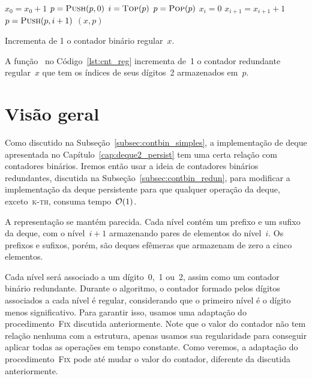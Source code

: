 \documentclass[main.tex]{subfiles}
\begin{document}
\begin{algorithm}
\begin{algorithmic}[1]

    \State $x_0 = x_0 + 1$
        \State $p = \Call{Push}{p, 0}$
    \EndIf
     
        \State $i = \Call{Top}{p}$
        \State $p = \Call{Pop}{p}$
        \State $x_i = 0$
        \State $x_{i+1} = x_{i+1} + 1$
            \State $p = \Call{Push}{p, i + 1}$
        \EndIf
    \EndIf
    \State \Return $(x, p)$
\EndFunction

\end{algorithmic}
\caption{Incrementa de 1 o contador binário regular~$x$. \label{lst:cnt_reg}}
\end{algorithm}

A função~ no Código~\ref{lst:cnt_reg} incrementa de~1 o contador redundante regular~$x$ que tem os índices de seus dígitos~2 armazenados em~$p$.

\section{Visão geral}

Como discutido na Subseção~\ref{subsec:contbin_simples}, a implementação de deque apresentada no Capítulo~\ref{cap:deque2_persist} tem uma certa relação com contadores binários. Iremos então usar a ideia de contadores binários redundantes, discutida na Subseção~\ref{subsec:contbin_redun}, para modificar a implementação da deque persistente para que qualquer operação da deque, exceto~\textsc{k-th}, consuma tempo~$\mathcal{O}(1)$.

A representação se mantém parecida. Cada nível contém um prefixo e um sufixo da deque, com o nível~$i+1$ armazenando pares de elementos do nível~$i$. Os prefixos e sufixos, porém, são deques efêmeras que armazenam de zero a cinco elementos.


Cada nível será associado a um dígito~0,~1 ou~2, assim como um contador binário redundante. Durante o algoritmo, o contador formado pelos dígitos associados a cada nível é regular, considerando que o primeiro nível é o dígito menos significativo. Para garantir isso, usamos uma adaptação do procedimento~\textsc{Fix} discutida anteriormente. Note que o valor do contador não tem relação nenhuma com a estrutura, apenas usamos sua regularidade para conseguir aplicar todas as operações em tempo constante. Como veremos, a adaptação do procedimento~\textsc{Fix} pode até mudar o valor do contador, diferente da discutida anteriormente.
\end{document}
